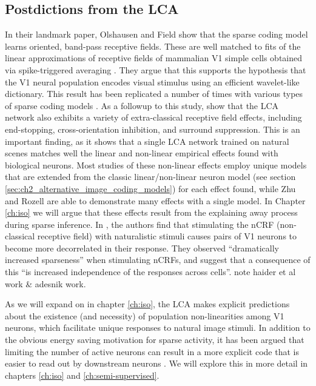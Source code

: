 \subsection{Postdictions from the LCA}
In their landmark paper, Olshausen and Field \citeyearpar{olshausen1996emergence} show that the sparse coding model learns oriented, band-pass receptive fields. These are well matched to fits of the linear approximations of receptive fields of mammalian V1 simple cells obtained via spike-triggered averaging \cite{vanHateren1998independent}. They argue that this supports the hypothesis that the V1 neural population encodes visual stimulus using an efficient wavelet-like dictionary. This result has been replicated a number of times with various types of sparse coding models . As a followup to this study, \parencite{zhu2013visual} show that the LCA network also exhibits a variety of extra-classical receptive field effects, including end-stopping, cross-orientation inhibition, and surround suppression. This is an important finding, as it shows that a single LCA network trained on natural scenes matches well the linear and non-linear empirical effects found with biological neurons. Most studies of these non-linear effects employ unique models that are extended from the classic linear/non-linear neuron model (see section \ref{sec:ch2_alternative_image_coding_models}) for each effect found, while Zhu and Rozell are able to demonstrate many effects with a single model. In Chapter \ref{ch:iso} we will argue that these effects result from the explaining away process during sparse inference. In \citeyearpar{vinje2000sparse}, the authors find that stimulating the nCRF (non-classical receptive field) with naturalistic stimuli causes pairs of V1 neurons to become more decorrelated in their response. They observed ``dramatically increased sparseness'' when stimulating nCRFs, and suggest that a consequence of this ``is increased independence of the responses across cells''. note haider et al work & adesnik work.

As we will expand on in chapter \ref{ch:iso}, the LCA makes explicit predictions about the existence (and necessity) of population non-linearities among V1 neurons, which facilitate unique responses to natural image stimuli. In addition to the obvious energy saving motivation for sparse activity, it has been argued that limiting the number of active neurons can result in a more explicit code that is easier to read out by downstream neurons \parencite{olshasen2002principles}. We will explore this in more detail in chapters \ref{ch:iso} and \ref{ch:semi-supervised}.

